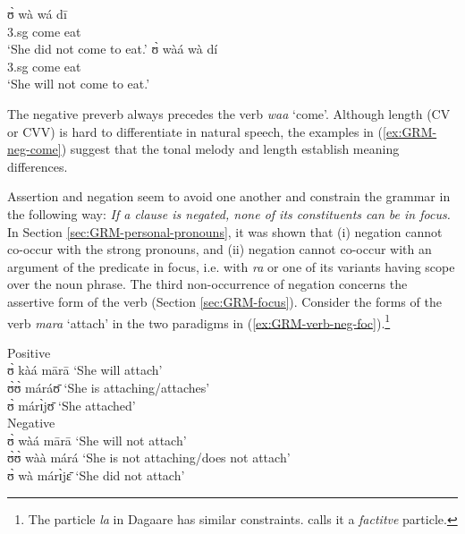 \begin{exe}
\begin{exe}
\begin{exe}
{\begin{exe}
\begin{exe}
\begin{exe}
\begin{exe}
\begin{exe}
\begin{exe}
\begin{exe}
\begin{xlist}
\begin{exe}
\begin{exe}
\begin{exe}
\begin{exe}
\begin{exe}
\begin{exe}
\begin{exe}
\begin{exe}
\begin{exe}
\begin{exe}
\begin{exe}
\begin{exe}
\begin{exe}
\begin{exe}
  
\ea\label{}
\gll ʊ̀ wà wá dī\\
{\sc 3.sg} {\neg} come eat\\
\glt `She did not come to eat.'
\ex\label{}
\gll ʊ̀ wàá wà dí\\
{\sc 3.sg} {\neg} come eat \\
\glt `She will not come to eat.'

\z 
 \z
 
 The negative preverb  always precedes the verb {\it waa} `come'. Although 
length (CV or CVV) is  hard to differentiate in natural speech, the examples in 
(\ref{ex:GRM-neg-come}) suggest that the tonal melody and length  establish 
meaning differences.

Assertion and negation seem to avoid one another and constrain the grammar  in
the following way:  {\it If a clause is negated,  none of its constituents can
be in focus.} In Section \ref{sec:GRM-personal-pronouns},  it was shown that (i)
negation cannot co-occur with the strong pronouns, and (ii) negation cannot
co-occur with an argument of the predicate in focus, i.e. with {\it ra} or one 
of
its variants having scope over the noun phrase. The third non-occurrence of
negation concerns  the assertive form of the verb (Section
\ref{sec:GRM-focus}).  Consider the forms of the verb {\it mara} `attach' in the
two paradigms in (\ref{ex:GRM-verb-neg-foc}).\footnote{The particle {\it la} in
Dagaare has similar constraints. \citet[94]{Bodo97} calls it a {\it factitve}
particle.}





   \ea\label{ex:GRM-verb-neg-foc}

   \ea\label{ex:GRM-verb-neg-foc-pos}{\rm Positive}\\

 ʊ̀ kàá mārā   {\rm  `She will attach'}\\
   ʊ̀ʊ̀ máráʊ̄  {\rm     `She  is attaching/attaches'}\\
  ʊ̀ márɪ̀jʊ̄    {\rm `She   attached'}\\

  \ex\label{ex:GRM-verb-neg-foc-neg}{\rm Negative}\\

 ʊ̀ wàá mārā  {\rm `She will not attach'}\\
   ʊ̀ʊ̀ wàà márá    {\rm  `She  is  not attaching/does not attach'}\\
  ʊ̀ wà márɪ̀jɛ̄   {\rm  `She   did not attach'}\\



\end{exe}
\end{exe}
\end{exe}
\end{exe}
\end{exe}
\end{exe}
\end{exe}
\end{exe}
\end{exe}
\end{exe}
\end{exe}
\end{exe}
\end{exe}
\end{exe}
\end{xlist}
\end{exe}
\end{exe}
\end{exe}
\end{exe}
\end{exe}
\end{exe}
\end{exe}}
\end{exe}
\end{exe}
\end{exe}
